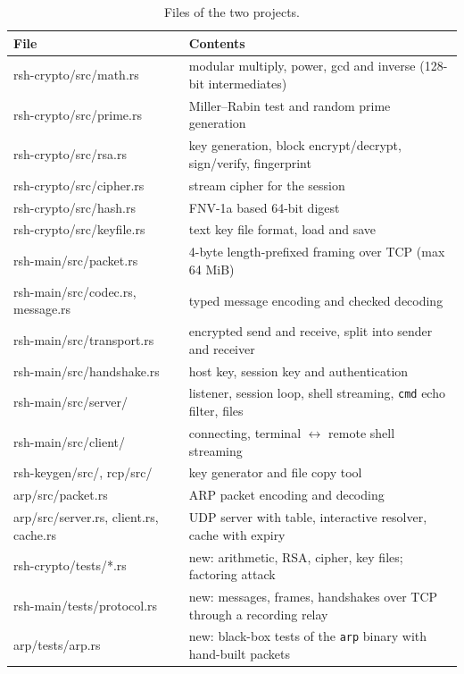 \documentclass[11pt,a4paper]{article}
\begin{document}
\begin{table}[H]
\centering
\footnotesize
\begin{tabularx}{\textwidth}{@{}>{\ttfamily}l X@{}}
\toprule
\normalfont File & Contents \\
\midrule
rsh-crypto/src/math.rs      & modular multiply, power, gcd and inverse (128-bit intermediates) \\
rsh-crypto/src/prime.rs     & Miller--Rabin test and random prime generation \\
rsh-crypto/src/rsa.rs       & key generation, block encrypt/decrypt, sign/verify, fingerprint \\
rsh-crypto/src/cipher.rs    & stream cipher for the session \\
rsh-crypto/src/hash.rs      & FNV-1a based 64-bit digest \\
rsh-crypto/src/keyfile.rs   & text key file format, load and save \\
rsh-main/src/packet.rs      & 4-byte length-prefixed framing over TCP (max 64 MiB) \\
rsh-main/src/codec.rs, message.rs & typed message encoding and checked decoding \\
rsh-main/src/transport.rs   & encrypted send and receive, split into sender and receiver \\
rsh-main/src/handshake.rs   & host key, session key and authentication \\
rsh-main/src/server/        & listener, session loop, shell streaming, \texttt{cmd} echo filter, files \\
rsh-main/src/client/        & connecting, terminal $\leftrightarrow$ remote shell streaming \\
rsh-keygen/src/, rcp/src/   & key generator and file copy tool \\
arp/src/packet.rs           & ARP packet encoding and decoding \\
arp/src/server.rs, client.rs, cache.rs & UDP server with table, interactive resolver, cache with expiry \\
\midrule
rsh-crypto/tests/*.rs       & new: arithmetic, RSA, cipher, key files; factoring attack \\
rsh-main/tests/protocol.rs  & new: messages, frames, handshakes over TCP through a recording relay \\
arp/tests/arp.rs            & new: black-box tests of the \texttt{arp} binary with hand-built packets \\
\bottomrule
\end{tabularx}
\caption{Files of the two projects.}
\end{table}
\end{document}
